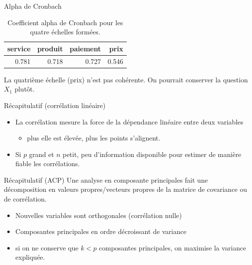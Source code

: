 \documentclass[
  ignorenonframetext,
]{beamer}
\providecommand{\tightlist}{%
  \setlength{\itemsep}{0pt}\setlength{\parskip}{0pt}}\usepackage{longtable,booktabs,array}
\begin{document}
\begin{frame}{Alpha de Cronbach}
\protect\hypertarget{alpha-de-cronbach}{}
\hypertarget{tbl-alphaCronbach}{}
\begin{table}
\caption{\label{tbl-alphaCronbach}Coefficient alpha de Cronbach pour les quatre échelles formées. }\tabularnewline

\centering
\begin{tabular}{rrrr}
\toprule
service & produit & paiement & prix\\
\midrule
0.781 & 0.718 & 0.727 & 0.546\\
\bottomrule
\end{tabular}
\end{table}

La quatrième échelle (prix) n'est pas cohérente. On pourrait conserver
la question \(X_1\) plutôt.
\end{frame}

\begin{frame}{Récapitulatif (corrélation linéaire)}
\protect\hypertarget{ruxe9capitulatif-corruxe9lation-linuxe9aire}{}
\begin{itemize}
\tightlist
\item
  La corrélation mesure la force de la dépendance linéaire entre deux
  variables

  \begin{itemize}
  \tightlist
  \item
    plus elle est élevée, plus les points s'alignent.
  \end{itemize}
\item
  Si \(p\) grand et \(n\) petit, peu d'information disponible pour
  estimer de manière fiable les corrélations.
\end{itemize}
\end{frame}

\begin{frame}{Récapitulatif (ACP)}
\protect\hypertarget{ruxe9capitulatif-acp}{}
Une analyse en composante principales fait une décomposition en valeurs
propres/vecteurs propres de la matrice de covariance ou de corrélation.

\begin{itemize}
\tightlist
\item
  Nouvelles variables sont orthogonales (corrélation nulle)
\item
  Composantes principales en ordre décroissant de variance
\item
  si on ne conserve que \(k<p\) composantes principales, on maximise la
  variance expliquée.
\end{itemize}
\end{frame}
\end{document}
